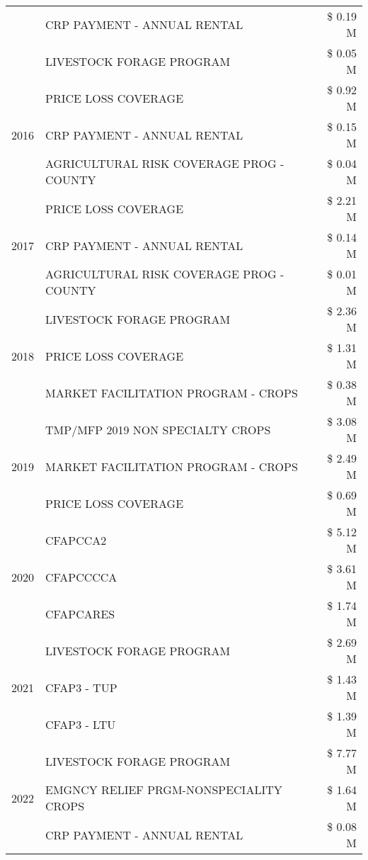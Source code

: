 \begin{tabular}{llr}
 & CRP PAYMENT - ANNUAL RENTAL & \$ 0.19 M \\
 & LIVESTOCK FORAGE PROGRAM & \$ 0.05 M \\
\cline{1-3}
\multirow[t]{3}{*}{2016} & PRICE LOSS COVERAGE & \$ 0.92 M \\
 & CRP PAYMENT - ANNUAL RENTAL & \$ 0.15 M \\
 & AGRICULTURAL RISK COVERAGE PROG - COUNTY & \$ 0.04 M \\
\cline{1-3}
\multirow[t]{3}{*}{2017} & PRICE LOSS COVERAGE & \$ 2.21 M \\
 & CRP PAYMENT - ANNUAL RENTAL & \$ 0.14 M \\
 & AGRICULTURAL RISK COVERAGE PROG - COUNTY & \$ 0.01 M \\
\cline{1-3}
\multirow[t]{3}{*}{2018} & LIVESTOCK FORAGE PROGRAM & \$ 2.36 M \\
 & PRICE LOSS COVERAGE & \$ 1.31 M \\
 & MARKET FACILITATION PROGRAM - CROPS & \$ 0.38 M \\
\cline{1-3}
\multirow[t]{3}{*}{2019} & TMP/MFP 2019 NON SPECIALTY CROPS & \$ 3.08 M \\
 & MARKET FACILITATION PROGRAM - CROPS & \$ 2.49 M \\
 & PRICE LOSS COVERAGE & \$ 0.69 M \\
\cline{1-3}
\multirow[t]{3}{*}{2020} & CFAPCCA2 & \$ 5.12 M \\
 & CFAPCCCCA & \$ 3.61 M \\
 & CFAPCARES & \$ 1.74 M \\
\cline{1-3}
\multirow[t]{3}{*}{2021} & LIVESTOCK FORAGE PROGRAM & \$ 2.69 M \\
 & CFAP3 - TUP & \$ 1.43 M \\
 & CFAP3 - LTU & \$ 1.39 M \\
\cline{1-3}
\multirow[t]{3}{*}{2022} & LIVESTOCK FORAGE PROGRAM & \$ 7.77 M \\
 & EMGNCY RELIEF PRGM-NONSPECIALITY CROPS & \$ 1.64 M \\
 & CRP PAYMENT - ANNUAL RENTAL & \$ 0.08 M \\
\cline{1-3}
\bottomrule
\end{tabular}
